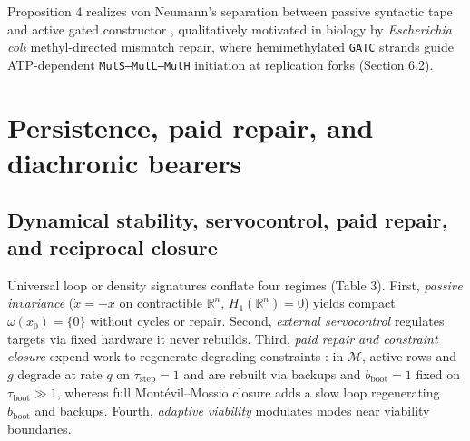 \documentclass[11pt,letterpaper]{article}
\begin{document}
Proposition 4 realizes von Neumann's \citeyearpar{vonNeumann1966}
separation between passive syntactic tape and active gated constructor
\citep{rosen1991, deacon2011}, qualitatively motivated in biology by
\emph{Escherichia coli} methyl-directed mismatch repair, where
hemimethylated \texttt{GATC} strands guide ATP-dependent
\texttt{MutS–MutL–MutH} initiation at replication forks
\citep{auWelshModrich1992, hasanLeach2015} (Section 6.2).

\section{Persistence, paid repair, and diachronic
bearers}\label{persistence-paid-repair-and-diachronic-bearers}

\subsection{Dynamical stability, servocontrol, paid repair, and
reciprocal
closure}\label{dynamical-stability-servocontrol-paid-repair-and-reciprocal-closure}

Universal loop or density signatures \citep{friston2013} conflate four
regimes (Table 3). First, \emph{passive invariance} (\(\dot{x} = -x\) on
contractible \(\mathbb{R}^n\), \(H_1(\mathbb{R}^n) = 0\)) yields compact
\(\omega(x_0) = \{0\}\) without cycles or repair. Second, \emph{external
servocontrol} \citep{rosenblueth1943, conantAshby1970} regulates targets
via fixed hardware it never rebuilds. Third, \emph{paid repair and
constraint closure}
\citetext{\citealp[§§64--65]{kant1790}; \citealp{varela1974}; \citealp{maturanaVarela1980}; \citealp{weberVarela2002}; \citealp{rosen1991}; \citealp{kauffman1993}; \citealp{deacon2011}; \citealp{mossio2009}; \citealp{montevilMossio2015}}
expend work to regenerate degrading constraints
\citep{jonas1966, thompson2007}: in \(\mathcal{M}\), active rows and
\(g\) degrade at rate \(q\) on \(\tau_{\mathrm{step}}=1\) and are
rebuilt via backups and \(b_{\mathrm{boot}}=1\) fixed on
\(\tau_{\mathrm{boot}} \gg 1\), whereas full Montévil--Mossio closure
adds a slow loop regenerating \(b_{\mathrm{boot}}\) and backups. Fourth,
\emph{adaptive viability}
\citep{aubinCellina1984, diPaolo2005, barandiaran2009, bich2024}
modulates modes near viability boundaries.

\end{document}
